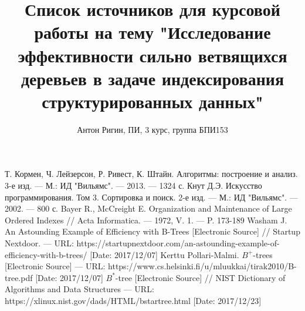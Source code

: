 \documentclass[a4paper,12pt]{article}
\title{Список источников для курсовой работы на тему "Исследование эффективности сильно ветвящихся деревьев в задаче индексирования структурированных данных"}
\author{Антон Ригин, ПИ, 3 курс, группа БПИ153}
\date{}
\begin{document}
	
	\maketitle
	
	\begin{thebibliography}{1}
		Т. Кормен, Ч. Лейзерсон, Р. Ривест, К. Штайн. Алгоритмы: построение и анализ. 3-е изд. --- М.: ИД "Вильямс". --- 2013. --- 1324 с.
		Кнут Д.Э. Искусство программирования. Том 3. Сортировка и поиск. 2-е изд. --- М.: ИД "Вильямс". --- 2002. --- 800 с.
		Bayer R., McCreight E. Organization and Maintenance of Large Ordered Indexes // Acta Informatica. --- 1972, V. 1. --- P. 173-189
		Washam J. An Astounding Example of Efficiency with B-Trees [Electronic Source] // Startup Nextdoor. --- URL: https://startupnextdoor.com/an-astounding-example-of-efficiency-with-b-trees/ [Date: 2017/12/07]
		Kerttu Pollari-Malmi. $B^+$-trees [Electronic Source] --- URL: https://www.cs.helsinki.fi/u/mluukkai/tirak2010/B-tree.pdf [Date: 2017/12/07]
		$B^*$-tree [Electronic Source] // NIST Dictionary of Algorithms and Data Structures --- URL: https://xlinux.nist.gov/dads/HTML/bstartree.html [Date: 2017/12/23]
	\end{thebibliography}
	
\end{document}
